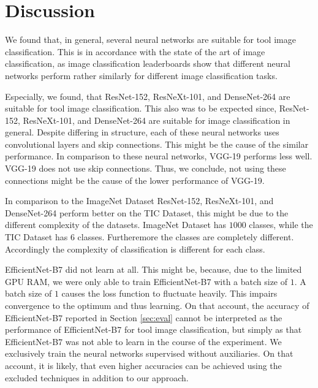 \documentclass[a4paper, 10pt, journal]{wissarbIEEE}
\begin{document}
\section{Discussion}
\label{sec:discussion}
We found that, in general, several neural networks are suitable for tool image classification. This is in accordance with the state of the art of image classification, as image classification leaderboards show that different neural networks perform rather similarly for different image classification tasks. \cite{Foret.2020}
\par
Especially, we found, that ResNet-152, ResNeXt-101, and DenseNet-264 are suitable for tool image classification. This also was to be expected since, ResNet-152, ResNeXt-101, and DenseNet-264 are suitable for image classification in general. \cite{Xie.2017, He.2016, Huang.2017} Despite differing in structure, each of these neural networks uses convolutional layers and skip connections. \cite{Xie.2017, He.2016, Huang.2017} This might be the cause of the similar performance. In comparison to these neural networks, VGG-19 performs less well. VGG-19 does not use skip connections. \cite{Simonyan.2014} Thus, we conclude, not using these connections might be the cause of the lower performance of VGG-19.
\par
In comparison to the ImageNet Dataset ResNet-152, ResNeXt-101, and DenseNet-264 perform better on the TIC Dataset, this might be due to the different complexity of the datasets. ImageNet Dataset has $1000$ classes, while the TIC Dataset has $6$ classes. Furtheremore the classes are completely different. Accordingly the complexity of classification is different for each class.
\par
EfficientNet-B7 did not learn at all. This might be, because, due to the limited GPU RAM, we were only able to train EfficientNet-B7 with a batch size of $1$. A batch size of $1$ causes the loss function to fluctuate heavily. This impairs convergence to the optimum and thus learning.\cite{Ruder.2016} On that account, the accuracy of EfficientNet-B7 reported in Section \ref{sec:eval} cannot be interpreted as the performance of EfficientNet-B7 for tool image classification, but simply as that EfficientNet-B7 was not able to learn in the course of the experiment.
We exclusively train the neural networks supervised without auxiliaries. On that account, it is likely, that even higher accuracies can be achieved using the excluded techniques in addition to our approach.
\end{document}
